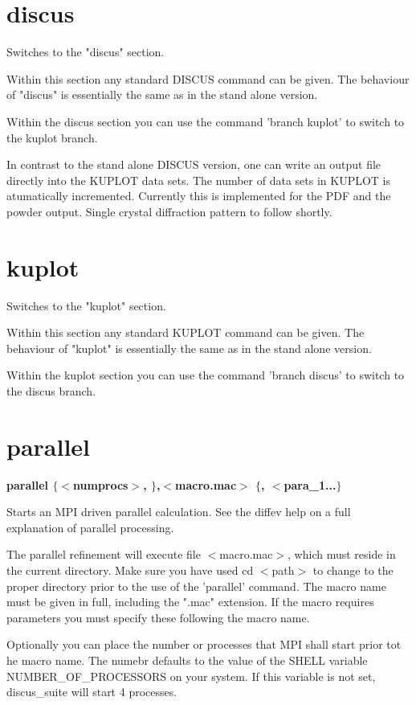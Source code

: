 \section{discus}
\par
Switches to the "discus" section. 
\par
Within this section any standard DISCUS command can be 
given. The behaviour of "discus" is essentially the same 
as in the stand alone version. 
\par
Within the discus section you can use the command 
'branch kuplot' to switch to the kuplot branch. 
\par
In contrast to the stand alone DISCUS version, one can 
write an output file directly into the KUPLOT data sets. 
The number of data sets in KUPLOT is atumatically incremented. 
Currently this is implemented for the PDF and the powder 
output. Single crystal diffraction pattern to follow 
shortly. 
\section{kuplot}
\par
Switches to the "kuplot" section. 
\par
Within this section any standard KUPLOT command can be 
given. The behaviour of "kuplot" is essentially the same 
as in the stand alone version. 
\par
Within the kuplot section you can use the command 
'branch discus' to switch to the discus branch. 
\section{parallel}
{\bf parallel $ \{$$ <$numprocs$> $, $\} $,$ <$macro.mac$> $ $ \{$, $ <$para\_1...$\} $ \par }
\par
\vspace{3pt}
Starts an MPI driven parallel calculation. See the diffev help 
on a full explanation of parallel processing. 
\par
The parallel refinement will execute file $ <$macro.mac$> $, which 
must reside in the current directory. Make sure you have used 
cd $ <$path$> $ to change to the proper directory prior to the use 
of the 'parallel' command. The macro name must be given in 
full, including the ".mac" extension. If the macro requires 
parameters you must specify these following the macro name. 
\par
Optionally you can place the number or processes that MPI shall 
start prior tot he macro name. The numebr defaults to the value 
of the SHELL variable NUMBER\_OF\_PROCESSORS on your system. If this 
variable is not set, discus\_suite will start 4 processes. 
\par
